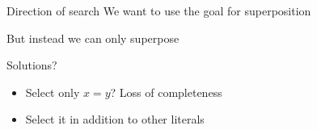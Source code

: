 \begin{frame}{Direction of search}
  We want to use the goal for superposition
  \begin{prooftree}
  \end{prooftree}
  But instead we can only superpose
  \begin{prooftree}
  \end{prooftree}
\end{frame}

\begin{frame}{Solutions?}
  \begin{itemize}
  \item Select only $x = y$? Loss of completeness
  \item Select it in addition to other literals
  \end{itemize}
  
  {\footnotesize
    \begin{prooftree}
    \end{prooftree}
  }
\end{frame}
